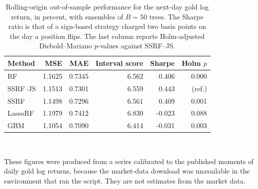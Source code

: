 \begin{table}[htbp]
\centering
\caption{Rolling-origin out-of-sample performance for the next-day gold log return, in percent, with ensembles of $B=50$ trees. The Sharpe ratio is that of a sign-based strategy charged two basis points on the day a position flips. The last column reports Holm-adjusted Diebold--Mariano $p$-values against SSRF--JS.}
\label{tab:gold_B50}
\small
\setlength{\tabcolsep}{5pt}
\begin{tabular}{lrrrrr}
\toprule
Method & MSE & MAE & Interval score & Sharpe & Holm $p$ \\
\midrule
RF & 1.1625 & 0.7345 & 6.562 & 0.406 & 0.000 \\
SSRF--JS & 1.1513 & 0.7301 & 6.559 & 0.443 & (ref.) \\
SSRF & 1.1498 & 0.7296 & 6.561 & 0.409 & 0.001 \\
LassoRF & 1.1979 & 0.7412 & 6.830 & -0.023 & 0.088 \\
GBM & 1.1054 & 0.7090 & 6.414 & -0.031 & 0.003 \\
\bottomrule
\end{tabular}
\\[2pt]
\parbox{\textwidth}{\footnotesize These figures were produced from a series calibrated to the published moments of daily gold log returns, because the market-data download was unavailable in the environment that ran the script. They are not estimates from the market data.}
\end{table}

